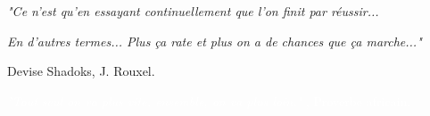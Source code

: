 \noindent \hrulefill

\vspace{2cm}
\begin{flushright}
\textit{"Ce n'est qu'en essayant continuellement que l'on finit par réussir... }

\textit{En d'autres termes... Plus ça rate et plus on a de chances que ça marche..."}

Devise Shadoks, J. Rouxel.
\end{flushright}



\textcolor{white}{
\begin{flushright}
\textit{"Tout seul on va plus vite, ensemble, on va plus loin." }
, Proverbe africain.
\end{flushright}
}